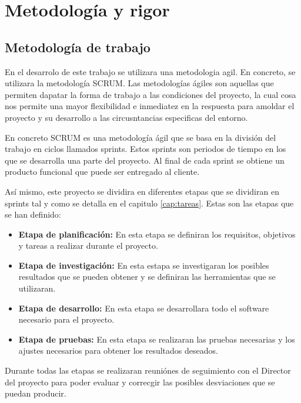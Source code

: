 \chapter{Metodología y rigor}
\label{cap:metodologia}

\section{Metodología de trabajo}
\label{sec:metodologia:metodologia_trabajo}

En el desarrolo de este trabajo se utilizara una metodologia agil. En concreto, se utilizara 
la metodología SCRUM. Las metodologías ágiles son aquellas que permiten dapatar la forma de
trabajo a las condiciones del proyecto, la cual cosa nos permite una mayor flexibilidad e 
inmediatez en la respuesta para amoldar el proyecto y su desarrollo a las circusntancias
especificas del entorno.

En concreto SCRUM es una metodología ágil que se basa en la división del trabajo en ciclos
llamados sprints. Estos sprints son periodos de tiempo en los que se desarrolla una parte
del proyecto. Al final de cada sprint se obtiene un producto funcional que puede ser entregado
al cliente. \cite{MetodoAgile}

Así mismo, este proyecto se dividira en diferentes etapas que se dividiran en sprints tal y
como se detalla en el capitulo \ref{cap:tareas}. Estas son las etapas que se han definido:

\begin{itemize}
    \item \textbf{Etapa de planificación:} En esta etapa se definiran los requisitos, 
    objetivos y tareas a realizar durante el proyecto.
    \item \textbf{Etapa de investigación:} En esta estapa se investigaran los posibles 
    resultados que se pueden obtener y se definiran las herramientas que se utilizaran.
    \item \textbf{Etapa de desarrollo:} En esta etapa se desarrollara todo el software 
    necesario para el proyecto.
    \item \textbf{Etapa de pruebas:} En esta etapa se realizaran las pruebas necesarias y los 
    ajustes necesarios para obtener los resultados deseados.
\end{itemize}

Durante todas las etapas se realizaran reuniónes de seguimiento con el Director del proyecto para
poder evaluar y correcgir las posibles desviaciones que se puedan producir.

